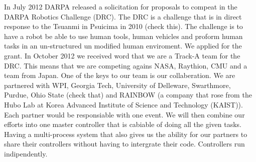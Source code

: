 In July 2012 DARPA released a solicitation for proposals to compeat in the DARPA Robotics Challenge (DRC).
The DRC is a challenge that is in direct response to the Tsuanmi in Psuicima in 2010 (check this).
The challenge is to have a robot be able to use human tools, human vehicles and proform human tasks in an un-structured un modified human enviroment.
We applied for the grant.
In October 2012 we received word that we are a Track-A team for the DRC.
This means that we are competing agains NASA, Raythion, CMU and a team from Japan.
One of the keys to our team is our collaberation.
We are partnered with WPI, Georgia Tech, University of Delleware, Swarthmore, Purdue, Ohio State (check that) and RAINBOW (a company that rose from the Hubo Lab at Korea Advanced Institute of Science and Technology (KAIST)).
Each partner would be responsiable with one event.
We will then combine our efforts into one master controller that is cabiable of doing all the given tasks.
Having a multi-process system that also gives us the ability for our partners to share their controllers without having to intergrate their code.  
Controllers run indipendently.
